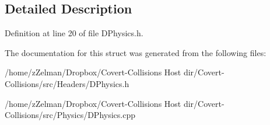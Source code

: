 \subsection{Detailed Description}


Definition at line 20 of file D\-Physics.\-h.



The documentation for this struct was generated from the following files\-:\begin{DoxyCompactItemize}
\item 
/home/z\-Zelman/\-Dropbox/\-Covert-\/\-Collisions Host dir/\-Covert-\/\-Collisions/src/\-Headers/D\-Physics.\-h\item 
/home/z\-Zelman/\-Dropbox/\-Covert-\/\-Collisions Host dir/\-Covert-\/\-Collisions/src/\-Physics/D\-Physics.\-cpp\end{DoxyCompactItemize}
